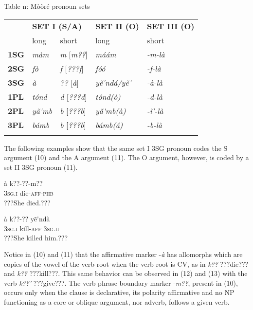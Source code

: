 \documentclass[output=paper]{langsci/langscibook}
\begin{document}
\begin{table}\caption{
\label{bkm:Ref424142670}Table n: Mòòré pronoun sets
}\end{table}

\begin{tabularx}{\textwidth}{XXXXX}
\lsptoprule
\hhline{~----} & \multicolumn{2}{l}{ \textbf{SET I (S/A)}} & \textbf{SET II (O)} & \textbf{SET III (O)}\\
& long & short & long & short\\
\textbf{1SG} & \textit{màm} & \textit{m   }[\textit{m??}] & \textit{máám} & \textit{{}-m-là}\\
\textbf{2SG} & \textit{fò} & \textit{f     }[\textit{???f}] & \textit{fóó} & \textit{{}-f-là}\\
\textbf{3SG} & \textit{à} & \textit{??    }[\textit{à}] & \textit{yẽ\'{ }ndá/yẽ\'{ }} & \textit{{}-à-là}\\
\textbf{1PL} & \textit{tónd} & \textit{d}    [\textit{???d}] & \textit{tónd(ò)} & \textit{{}-d-là}\\
\textbf{2PL} & \textit{yã\'{ }mb} & \textit{b    }[\textit{???b}] & \textit{yã\'{ }mb(à)} & \textit{{}-\~{i}\'{ }-là}\\
\textbf{3PL} & \textit{bámb} & \textit{b    }[\textit{???b}] & \textit{bámb(á)} & \textit{{}-b-là}\\
\lspbottomrule
\end{tabularx}
The following examples show that the same set I 3SG pronoun codes the S argument (10) and the A argument (11). The O argument, however, is coded by a set II 3SG pronoun (11).

\ea \gll 
\label{bkm:Ref424141576}à    k??-??{}-m??          
\\
%
\textsc{3sg.i    }die-\textsc{aff-phb}
\\\glt
???She died.???
\z

\ea \gll 
\label{bkm:Ref424141584}à    k??-??    yẽ\'{ }ndà
\\
%
\textsc{3sg.i}    kill-\textsc{aff  3sg.ii}
\\\glt
???She killed him.???
\z

Notice in (10) and (11) that the affirmative marker -\textit{à} has allomorphs which are copies of the vowel of the verb root when the verb root is CV, as in \textit{k??} ???die??? and \textit{k??} ???kill???. This same behavior can be observed in (12) and (13) with the verb \textit{k??\'{ }} ???give???. The verb phrase boundary marker -\textit{m??}, present in (10), occurs only when the clause is declarative, its polarity affirmative and no NP functioning as a core or oblique argument, nor adverb, follows a given verb.  
\end{document}
